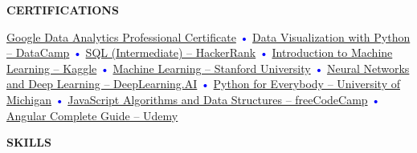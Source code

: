 \documentclass[11pt]{article}
\newcommand{\SectionBox}[1]{%
\vspace{6pt}
\begin{tcolorbox}[
    colback=black!10,    %
    colframe=black!10,   %
    boxrule=0pt,        %
    arc=8pt,            %
    left=5pt, right=5pt, top=4pt, bottom=4pt,
    width=\textwidth,   %
    halign=center,      %
    valign=center       %
]
\textbf{\large #1}
\end{tcolorbox}
\vspace{-1pt}
}
\newcommand{\CertificationsSection}[0]{\SectionBox{CERTIFICATIONS}}
\newcommand{\SkillsSection}[0]{\SectionBox{SKILLS}} %
\begin{document}
\CertificationsSection
\href{https://www.coursera.org/professional-certificates/google-data-analytics}{Google Data Analytics Professional Certificate} 
\textcolor{blue}{\Large •} 
\href{https://www.datacamp.com/courses/data-visualization-with-python}{Data Visualization with Python – DataCamp} 
\textcolor{blue}{\Large •} 
\href{https://www.hackerrank.com/skills-verification/sql_intermediate}{SQL (Intermediate) – HackerRank} 
\textcolor{blue}{\Large •} 
\href{https://www.kaggle.com/learn/intro-to-machine-learning}{Introduction to Machine Learning – Kaggle} 
\textcolor{blue}{\Large •} 
\href{https://www.coursera.org/learn/machine-learning}{Machine Learning – Stanford University} 
\textcolor{blue}{\Large •} 
\href{https://www.coursera.org/learn/neural-networks-deep-learning}{Neural Networks and Deep Learning – DeepLearning.AI} 
\textcolor{blue}{\Large •} 
\href{https://www.coursera.org/specializations/python}{Python for Everybody – University of Michigan} 
\textcolor{blue}{\Large •} 
\href{https://www.freecodecamp.org/learn/javascript-algorithms-and-data-structures/}{JavaScript Algorithms and Data Structures – freeCodeCamp} 
\textcolor{blue}{\Large •} 
\href{https://www.udemy.com/course/angular-complete-guide/}{Angular Complete Guide – Udemy}


\SkillsSection
\vspace{0.2cm} %
\noindent\parbox[t]{\textwidth}{ %

    \noindent\parbox{\textwidth}{ %
        \hskip 3pt%
        \hskip 3pt%
        \hskip 3pt%
        \hskip 3pt%
        \hskip 3pt%
        \hskip 3pt%
        \hskip 3pt%
        \hskip 3pt%
        \hskip 3pt%
        \hskip 3pt%
        \hskip 3pt%
        \hskip 3pt%
        \hskip 3pt%
        \hskip 3pt%
        \hskip 3pt%
        \hskip 3pt%
        \hskip 3pt%
        \hskip 3pt%
        \hskip 3pt%
    }
} %
\end{document}
